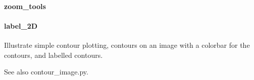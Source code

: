 \documentclass[letterpaper,10pt,openany,oneside]{sphinxmanual}
\begin{document}
\paragraph{zoom\_tools}
\label{rst/visu2d:module-Visu.zoom_tools}\label{rst/visu2d:zoom-tools}

\paragraph{label\_2D}
\label{rst/visu2d:module-Visu.label_2D}\label{rst/visu2d:label-2d}
Illustrate simple contour plotting, contours on an image with
a colorbar for the contours, and labelled contours.

See also contour\_image.py.
\end{document}
